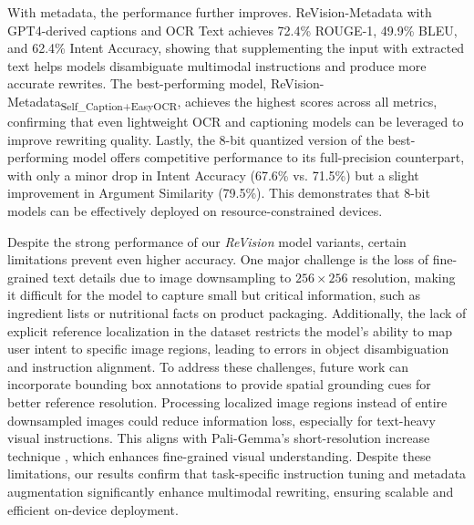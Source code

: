With metadata, the performance further improves. ReVision-Metadata with GPT4-derived captions and OCR Text achieves 72.4\% ROUGE-1, 49.9\% BLEU, and 62.4\% Intent Accuracy, showing that supplementing the input with extracted text helps models disambiguate multimodal instructions and produce more accurate rewrites. The best-performing model, ReVision-Metadata\textsubscript{Self\_Caption+EasyOCR}, achieves the highest scores across all metrics, confirming that even lightweight OCR and captioning models can be leveraged to improve rewriting quality. Lastly, the 8-bit quantized version of the best-performing model offers competitive performance to its full-precision counterpart, with only a minor drop in Intent Accuracy (67.6\% vs. 71.5\%) but a slight improvement in Argument Similarity (79.5\%). This demonstrates that 8-bit models can be effectively deployed on resource-constrained devices.

Despite the strong performance of our \textit{ReVision} model variants, certain limitations prevent even higher accuracy. One major challenge is the loss of fine-grained text details due to image downsampling to $256 \times 256$ resolution, making it difficult for the model to capture small but critical information, such as ingredient lists or nutritional facts on product packaging. Additionally, the lack of explicit reference localization in the dataset restricts the model’s ability to map user intent to specific image regions, leading to errors in object disambiguation and instruction alignment. To address these challenges, future work can incorporate bounding box annotations to provide spatial grounding cues for better reference resolution. Processing localized image regions instead of entire downsampled images could reduce information loss, especially for text-heavy visual instructions. This aligns with Pali-Gemma's short-resolution increase technique \cite{beyer2024paligemma}, which enhances fine-grained visual understanding. Despite these limitations, our results confirm that task-specific instruction tuning and metadata augmentation significantly enhance multimodal rewriting, ensuring scalable and efficient on-device deployment.

